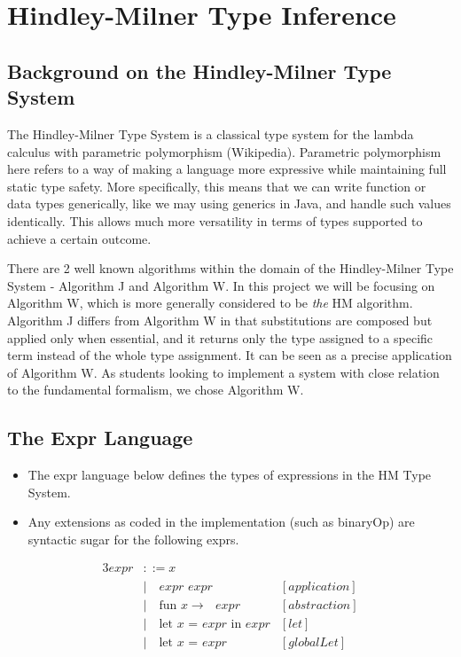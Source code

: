 \section{Hindley-Milner Type Inference}

\subsection{Background on the Hindley-Milner Type System}
The Hindley-Milner Type System is a classical type system for the lambda calculus with parametric polymorphism (Wikipedia). Parametric polymorphism here refers to a way of making a language more expressive while maintaining full static type safety. More specifically, this means that we can write function or data types generically, like we may using generics in Java, and handle such values identically. This allows much more versatility in terms of types supported to achieve a certain outcome.

There are 2 well known algorithms within the domain of the Hindley-Milner Type System - Algorithm J and Algorithm W. In this project we will be focusing on Algorithm W, which is more generally considered to be \textit{the} HM algorithm. Algorithm J differs from Algorithm W in that substitutions are composed but applied only when essential, and it returns only the type assigned to a specific term instead of the whole type assignment. It can be seen as a precise application of Algorithm W. As students looking to implement a system with close relation to the fundamental formalism, we chose Algorithm W.

\subsection{The Expr Language}
    \begin{itemize}
        \item The expr language below defines the types of expressions in the HM Type System.
        \item Any extensions as coded in the implementation (such as binaryOp) are syntactic sugar for the following exprs.
    \end{itemize}
    \begin{alignat*}{3}
    expr &::= x &\\
     &| \quad \textit{expr expr} 
     &[application]\\
     &| \quad \text{fun $x \rightarrow$ } expr &[abstraction]\\
     &| \quad \text{let $x$ = } expr \text{ in } expr &[let]\\
     &| \quad \text{let $x$ = } expr &[globalLet]
    \end{alignat*}


